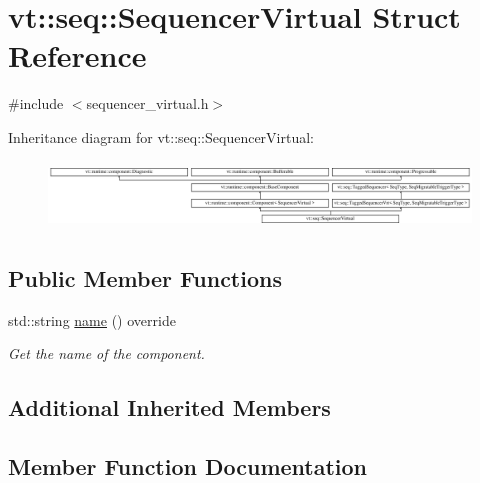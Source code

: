 \hypertarget{structvt_1_1seq_1_1_sequencer_virtual}{}\section{vt\+:\+:seq\+:\+:Sequencer\+Virtual Struct Reference}
\label{structvt_1_1seq_1_1_sequencer_virtual}


{\ttfamily \#include $<$sequencer\+\_\+virtual.\+h$>$}

Inheritance diagram for vt\+:\+:seq\+:\+:Sequencer\+Virtual\+:\begin{figure}[H]
\begin{center}
\leavevmode
\includegraphics[height=1.807910cm]{structvt_1_1seq_1_1_sequencer_virtual}
\end{center}
\end{figure}
\subsection*{Public Member Functions}
\begin{DoxyCompactItemize}
\item 
std\+::string \hyperlink{structvt_1_1seq_1_1_sequencer_virtual_ac51488cfa89d4749b1f5a85f7c2d180c}{name} () override
\begin{DoxyCompactList}\small\item\em Get the name of the component. \end{DoxyCompactList}\end{DoxyCompactItemize}
\subsection*{Additional Inherited Members}


\subsection{Member Function Documentation}
\mbox{\label{structvt_1_1seq_1_1_sequencer_virtual_ac51488cfa89d4749b1f5a85f7c2d180c}} 
